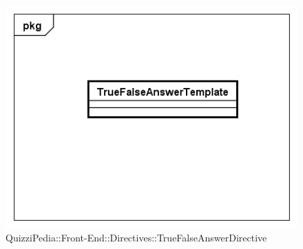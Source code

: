 		\label{QuizziPedia::Front-End::Directives::TrueFalseAnswerDirective}
		
		\begin{figure}[ht]
			\centering
			\includegraphics[scale=0.80,keepaspectratio]{UML/Classi/Front-End/QuizziPedia_Front-end_Templates_TrueFalseAnswerTemplate.png}
			\caption{QuizziPedia::Front-End::Directives::TrueFalseAnswerDirective}
		\end{figure} \FloatBarrier
		
